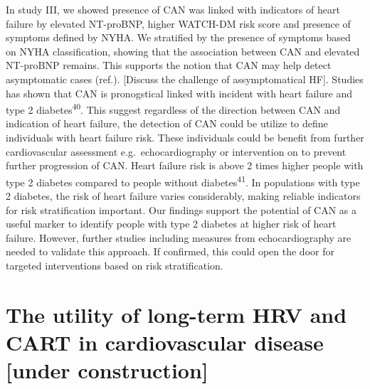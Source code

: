 \documentclass[
  a4paper,
  headsepline=true,
  open=any]{scrbook}
\begin{document}
In study III, we showed presence of CAN was linked with indicators of
heart failure by elevated NT-proBNP, higher WATCH-DM risk score and
presence of symptoms defined by NYHA. We stratified by the presence of
symptoms based on NYHA classification, showing that the association
between CAN and elevated NT-proBNP remains. This supports the notion
that CAN may help detect asymptomatic cases (ref.). {[}Discuss the
challenge of assymptomatical HF{]}. Studies has shown that CAN is
pronogstical linked with incident with heart failure and type 2
diabetes\textsuperscript{40}. This suggest regardless of the direction
between CAN and indication of heart failure, the detection of CAN could
be utilize to define individuals with heart failure risk. These
individuals could be benefit from further cardiovascular assessment
e.g.~echocardiography or intervention on to prevent further progression
of CAN. Heart failure risk is above 2 times higher people with type 2
diabetes compared to people without diabetes\textsuperscript{41}. In
populations with type 2 diabetes, the risk of heart failure varies
considerably, making reliable indicators for risk stratification
important. Our findings support the potential of CAN as a useful marker
to identify people with type 2 diabetes at higher risk of heart failure.
However, further studies including measures from echocardiography are
needed to validate this approach. If confirmed, this could open the door
for targeted interventions based on risk stratification.

\hypertarget{the-utility-of-long-term-hrv-and-cart-in-cardiovascular-disease-under-construction}{%
\section{The utility of long-term HRV and CART in cardiovascular disease
{[}under
construction{]}}\label{the-utility-of-long-term-hrv-and-cart-in-cardiovascular-disease-under-construction}}
\end{document}
